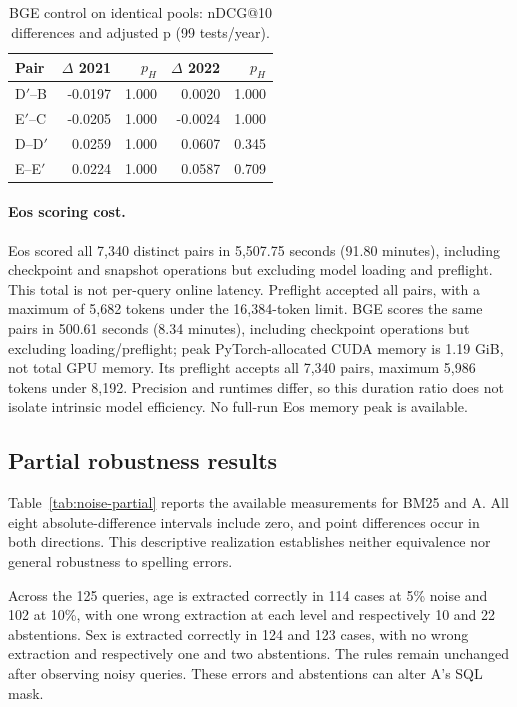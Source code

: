 \documentclass{article}
\begin{document}
\begin{table}[t]
\centering\small
\caption{BGE control on identical pools: nDCG@10 differences and adjusted p (99 tests/year).}
\begin{tabular}{lrrrr}
\toprule
Pair & $\Delta$ 2021 & $p_H$ & $\Delta$ 2022 & $p_H$ \\
\midrule
D$'$--B & -0.0197 & 1.000 & 0.0020 & 1.000 \\
E$'$--C & -0.0205 & 1.000 & -0.0024 & 1.000 \\
D--D$'$ & 0.0259 & 1.000 & 0.0607 & 0.345 \\
E--E$'$ & 0.0224 & 1.000 & 0.0587 & 0.709 \\
\bottomrule
\end{tabular}
\end{table}
\paragraph{Eos scoring cost.} Eos scored all 7{,}340 distinct pairs in 5{,}507.75 seconds (91.80 minutes), including checkpoint and snapshot operations but excluding model loading and preflight. This total is not per-query online latency. Preflight accepted all pairs, with a maximum of 5{,}682 tokens under the 16{,}384-token limit. BGE scores the same pairs in 500.61 seconds (8.34 minutes), including checkpoint operations but excluding loading/preflight; peak PyTorch-allocated CUDA memory is 1.19 GiB, not total GPU memory. Its preflight accepts all 7{,}340 pairs, maximum 5{,}986 tokens under 8{,}192. Precision and runtimes differ, so this duration ratio does not isolate intrinsic model efficiency. No full-run Eos memory peak is available.

\subsection{Partial robustness results}

Table~\ref{tab:noise-partial} reports the available measurements for BM25 and A. All eight absolute-difference intervals include zero, and point differences occur in both directions. This descriptive realization establishes neither equivalence nor general robustness to spelling errors.

Across the 125 queries, age is extracted correctly in 114 cases at 5\% noise and 102 at 10\%, with one wrong extraction at each level and respectively 10 and 22 abstentions. Sex is extracted correctly in 124 and 123 cases, with no wrong extraction and respectively one and two abstentions. The rules remain unchanged after observing noisy queries. These errors and abstentions can alter A's SQL mask.
\end{document}
